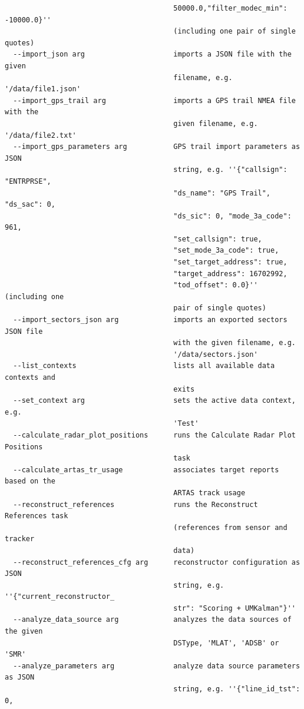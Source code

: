 \begin{lstlisting}
                                        50000.0,"filter_modec_min": -10000.0}''
                                        (including one pair of single quotes)
  --import_json arg                     imports a JSON file with the given
                                        filename, e.g. '/data/file1.json'
  --import_gps_trail arg                imports a GPS trail NMEA file with the
                                        given filename, e.g. '/data/file2.txt'
  --import_gps_parameters arg           GPS trail import parameters as JSON
                                        string, e.g. ''{"callsign": "ENTRPRSE",
                                        "ds_name": "GPS Trail", "ds_sac": 0,
                                        "ds_sic": 0, "mode_3a_code": 961,
                                        "set_callsign": true,
                                        "set_mode_3a_code": true,
                                        "set_target_address": true,
                                        "target_address": 16702992,
                                        "tod_offset": 0.0}'' (including one
                                        pair of single quotes)
  --import_sectors_json arg             imports an exported sectors JSON file
                                        with the given filename, e.g.
                                        '/data/sectors.json'
  --list_contexts                       lists all available data contexts and
                                        exits
  --set_context arg                     sets the active data context, e.g.
                                        'Test'
  --calculate_radar_plot_positions      runs the Calculate Radar Plot Positions
                                        task
  --calculate_artas_tr_usage            associates target reports based on the
                                        ARTAS track usage
  --reconstruct_references              runs the Reconstruct References task
                                        (references from sensor and tracker
                                        data)
  --reconstruct_references_cfg arg      reconstructor configuration as JSON
                                        string, e.g. ''{"current_reconstructor_
                                        str": "Scoring + UMKalman"}''
  --analyze_data_source arg             analyzes the data sources of the given
                                        DSType, 'MLAT', 'ADSB' or 'SMR'
  --analyze_parameters arg              analyze data source parameters as JSON
                                        string, e.g. ''{"line_id_tst": 0,

\end{lstlisting}
